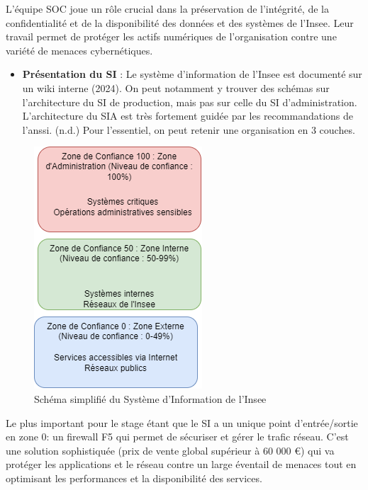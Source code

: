 \documentclass[
  letterpaper,
  DIV=11,
  numbers=noendperiod]{scrartcl}
\providecommand{\tightlist}{%
  \setlength{\itemsep}{0pt}\setlength{\parskip}{0pt}}\usepackage{longtable,booktabs,array}
\begin{document}
L'équipe SOC joue un rôle crucial dans la préservation de l'intégrité,
de la confidentialité et de la disponibilité des données et des systèmes
de l'Insee. Leur travail permet de protéger les actifs numériques de
l'organisation contre une variété de menaces cybernétiques.

\begin{itemize}
\tightlist
\item
  \textbf{Présentation du SI} : Le système d'information de l'Insee est
  documenté sur un wiki interne (2024). On peut notamment y trouver des
  schémas sur l'architecture du SI de production, mais pas sur celle du
  SI d'administration. L'architecture du SIA est très fortement guidée
  par les recommandations de l'anssi. (n.d.) Pour l'essentiel, on peut
  retenir une organisation en 3 couches.
\end{itemize}

\begin{figure}[H]

{\centering \includegraphics{figures/schema_SI_simplifie.png}

}

\caption{Schéma simplifié du Système d'Information de l'Insee}

\end{figure}%

Le plus important pour le stage étant que le SI a un unique point
d'entrée/sortie en zone 0: un firewall F5 qui permet de sécuriser et
gérer le trafic réseau. C'est une solution sophistiquée (prix de vente
global supérieur à 60 000 €) qui va protéger les applications et le
réseau contre un large éventail de menaces tout en optimisant les
performances et la disponibilité des services.
\end{document}
